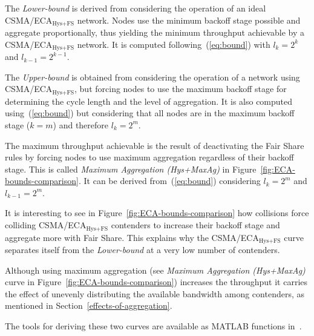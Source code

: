 	The \emph{Lower-bound} is derived from considering the operation of an ideal CSMA/ECA$_{\text{Hys+FS}}$ network. Nodes use the minimum backoff stage possible and aggregate proportionally, thus yielding the minimum throughput achievable by a CSMA/ECA$_{\text{Hys+FS}}$ network. It is computed following~(\ref{eq:bound}) with $l_{k}=2^{k}$ and $l_{k-1}=2^{k-1}$.
	
	The \emph{Upper-bound} is obtained from considering the operation of a network using CSMA/ECA$_{\text{Hys+FS}}$, but forcing nodes to use the maximum backoff stage for determining the cycle length and the level of aggregation. It is also computed using~(\ref{eq:bound}) but considering that all nodes are in the maximum backoff stage ($k=m$) and therefore $l_{k}=2^{m}$.
	
	The maximum throughput achievable is the result of deactivating the Fair Share rules by forcing nodes to use maximum aggregation regardless of their backoff stage. This is called \emph{Maximum Aggregation (Hys+MaxAg)} in Figure~\ref{fig:ECA-bounds-comparison}. It can be derived from~(\ref{eq:bound}) considering $l_{k} = 2^{m}$ and $l_{k-1}=2^{m}$.
		
	It is interesting to see in Figure~\ref{fig:ECA-bounds-comparison} how collisions force colliding CSMA/ECA$_{\text{Hys+FS}}$ contenders to increase their backoff stage and aggregate more with Fair Share. This explains why the CSMA/ECA$_{\text{Hys+FS}}$ curve separates itself from the \emph{Lower-bound} at a very low number of contenders. 
	
	Although using maximum aggregation (see \emph{Maximum Aggregation (Hys+MaxAg)} curve in Figure~\ref{fig:ECA-bounds-comparison}) increases the throughput it carries the effect of unevenly distributing the available bandwidth among contenders, as mentioned in Section~\ref{effects-of-aggregation}.
	
	The tools for deriving these two curves are available as MATLAB functions in~\cite{ECA-bounds-example}. 
	
